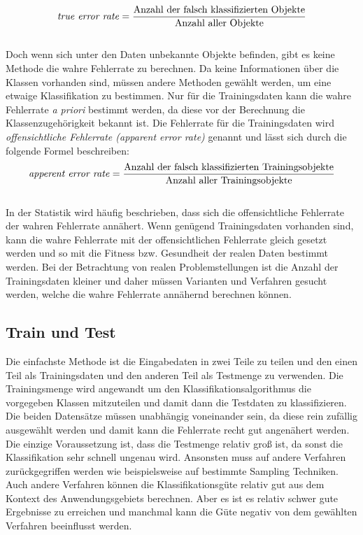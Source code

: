 \[\text{\textit{true error rate}} = \frac{\text{Anzahl der falsch klassifizierten Objekte}}{\text{Anzahl aller Objekte}}\]\\

Doch wenn sich unter den Daten unbekannte Objekte befinden, gibt es keine Methode die wahre Fehlerrate zu berechnen. Da keine Informationen über die Klassen vorhanden sind,  müssen andere Methoden gewählt werden, um eine etwaige Klassifikation zu bestimmen. Nur für die Trainingsdaten kann die wahre Fehlerrate \textit{a priori} bestimmt werden, da diese vor der Berechnung die Klassenzugehörigkeit bekannt ist. Die Fehlerrate für die Trainingsdaten wird \textit{offensichtliche Fehlerrate (apparent error rate)} genannt und lässt sich durch die folgende Formel beschreiben:\cite{mitch97}\\


\[\text{\textit{apperent error rate}} = \frac{\text{Anzahl der falsch klassifizierten Trainingsobjekte}}{\text{Anzahl aller Trainingsobjekte}}\]\\


In der Statistik wird häufig beschrieben, dass sich die offensichtliche Fehlerrate der wahren Fehlerrate annähert.  Wenn genügend Trainingsdaten vorhanden sind, kann die wahre Fehlerrate mit der offensichtlichen Fehlerrate gleich gesetzt werden und so mit die Fitness bzw. Gesundheit der realen Daten bestimmt werden. Bei der Betrachtung von realen Problemstellungen ist die Anzahl der Trainingsdaten kleiner und daher müssen Varianten und Verfahren gesucht werden, welche die wahre Fehlerrate annähernd berechnen können.\cite{weiss91}

\subsection{Train und Test}
Die einfachste Methode ist die Eingabedaten in zwei Teile zu teilen und den einen Teil als Trainingsdaten und den anderen Teil als Testmenge zu verwenden. Die Trainingsmenge wird angewandt um den Klassifikationsalgorithmus die vorgegeben Klassen mitzuteilen und damit dann die Testdaten zu klassifizieren. Die beiden Datensätze müssen unabhängig voneinander sein, da diese rein zufällig ausgewählt werden und damit kann die Fehlerrate recht gut angenähert werden. Die einzige Voraussetzung ist, dass die Testmenge relativ groß ist, da sonst die Klassifikation sehr schnell ungenau wird. Ansonsten muss auf andere Verfahren zurückgegriffen werden wie beispielsweise auf bestimmte Sampling Techniken. \cite{mitch97}\\
Auch andere Verfahren können die Klassifikationsgüte relativ gut aus dem Kontext des Anwendungsgebiets berechnen. Aber es ist es relativ schwer gute Ergebnisse zu erreichen und manchmal kann die Güte negativ von dem gewählten Verfahren beeinflusst werden.  \cite{weiss91}
